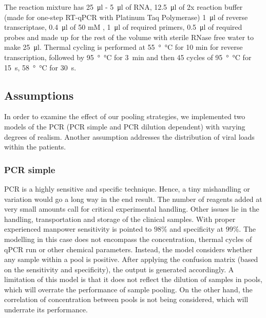 \documentclass[fleqn,10pt]{wlscirep}
\begin{document}
	The reaction mixture has \SI{25}{\micro\litre} - \SI{5}{\micro\litre} of RNA, \SI{12.5}{\micro\litre} of 2x reaction buffer (made for one-step RT-qPCR with Platinum Taq Polymerase) \SI{1}{\micro\litre} of reverse transcriptase, \SI{0.4}{\micro\litre} of 50 mM , \SI{1}{\micro\litre} of required primers, \SI{0.5}{\micro\litre} of required probes and made up for the rest of the volume with sterile RNase free water to make \SI{25}{\micro\litre}. Thermal cycling is performed at \SI{55}{\degree\celsius} for 10 min for reverse transcription, followed by \SI{95}{\degree\celsius} for \SI{3}{\minute} and then 45 cycles of \SI{95}{\degree\celsius} for \SI{15}{\second}, \SI{58}{\degree\celsius} for \SI{30}{\second}.
	
	
	\subsection{Assumptions}
	
	In order to examine the effect of our pooling strategies, we implemented two models of the PCR (PCR simple and PCR dilution dependent) with varying degrees of realism. Another assumption addresses the distribution of viral loads within the patients.
	
	\subsubsection{PCR simple}
	\label{sec:PCR_simple}
	PCR is a highly sensitive and specific technique. Hence, a tiny mishandling or variation would go a long way in the end result. The number of reagents added at very small amounts call for critical experimental handling. Other issues lie in the handling, transportation and storage of the clinical samples. With proper experienced manpower sensitivity is pointed to $98 \%$ and specificity at $99 \%$. The modelling in this case does not encompass the concentration, thermal cycles of qPCR run or other chemical parameters. Instead, the model considers whether any sample within a pool is positive. After applying the confusion matrix (based on the sensitivity and specificity), the output is generated accordingly. A limitation of this model is that it does not reflect the dilution of samples in pools, which will overrate the performance of sample pooling. On the other hand, the correlation of concentration between pools is not being considered, which will underrate its performance.
	
	
\end{document}
